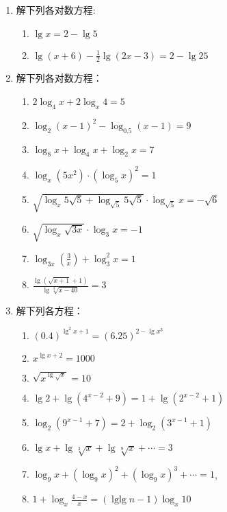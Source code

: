 \begin{enumerate}
\item  解下列各对数方程:

  \begin{enumerate}
   \item  $\lg x=2-\lg 5$
   \item $\lg(x+6)-\frac{1}{2}\lg(2x-3)=2-\lg 25$
  \end{enumerate}


\item 解下列各对数方程：
  \begin{enumerate}
  \item  $2 \log _{4} x+2 \log _{x} 4=5$ 
  \item  $\log _{2}(x-1)^{2}-\log _{0.5}(x-1)=9$
  \item  $\log _{8} x+\log _{4} x+\log _{2} x=7$
  \item  $\log _{x}\left(5 x^{2}\right) \cdot\left(\log _{5} x\right)^{2}=1$
  \item  $\sqrt{\log _{x} 5 \sqrt{5}+\log _{\sqrt{5}} 5 \sqrt{5}} \cdot \log _{\sqrt{5}} x=-\sqrt{6}$
  \item  $\sqrt{\log _{x} \sqrt{3 x}} \cdot \log _{3} x=-1$
  \item  $\log _{3 x}\left(\frac{3}{x}\right)+\log _{3}^{2} x=1$
  \item $\frac{\lg\left(\sqrt{x+1}+1\right)}{\lg\sqrt[3]{x-40}}=3$
  \end{enumerate}

  \item 解下列各方程：
\begin{enumerate}
  \item $(0.4)^{\lg^2 x+1}=(6.25)^{2-\lg x^3}$
  \item $x^{\lg x+2}=1000$
  \item $\sqrt{x^{\lg \sqrt{x}}}=10$
\item $\lg 2+\lg \left(4^{x-2}+9\right)=1+\lg \left(2^{x-2}+1\right)$
\item $\log _{2}\left(9^{x-1}+7\right)=2+\log _{2}\left(3^{x-1}+1\right)$
\item $\lg x+\lg \sqrt[3]{x}+\lg  \sqrt[9]{x}+\cdots=3$
\item $\log _{9} x+\left(\log _{9} x\right)^{2}+\left(\log _{9} x\right)^{3}+\cdots=1$,
\item $ 1+\log _{x} \frac{4-x}{x}=(\operatorname{lglg} n-1) \log _{x} 10$
\end{enumerate}


\end{enumerate}
